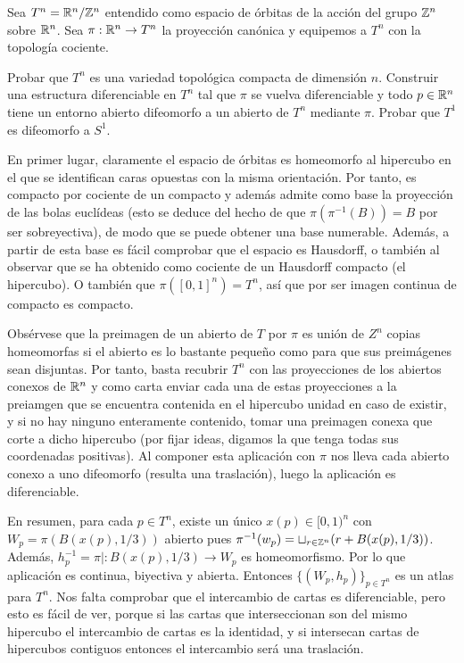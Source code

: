 \documentclass[twoside]{article}
\begin{document}
\begin{ejercicio}{8.4}
Sea $T^n=\mathbb{R}^n/\mathbb{Z}^n$ entendido como espacio de órbitas de la acción del grupo $\mathbb{Z}^n$ sobre $\mathbb{R}^n$. Sea $\pi:\mathbb{R}^n\to T^n$ la proyección canónica y equipemos a $T^n$ con la topología cociente.

Probar que $T^n$ es una variedad topológica compacta de dimensión $n$. Construir una estructura diferenciable en $T^n$ tal que $\pi$ se vuelva diferenciable y todo $p\in \mathbb{R}^n$ tiene un entorno abierto difeomorfo a un abierto de $T^n$ mediante $\pi$. Probar que $T^1$ es difeomorfo a $S^1$.  
\end{ejercicio}
\begin{solucion}
En primer lugar, claramente el espacio de órbitas es homeomorfo al hipercubo en el que se identifican caras opuestas con la misma orientación. Por tanto, es compacto por cociente de un compacto y además admite como base la proyección de las bolas euclídeas (esto se deduce del hecho de que $\pi(\pi^{-1}(B))=B$ por ser sobreyectiva), de modo que se puede obtener una base numerable. Además, a partir de esta base es fácil comprobar que el espacio es Hausdorff, o también al observar que se ha obtenido como cociente de un Hausdorff compacto (el hipercubo). O también que $\pi([0,1]^n)=T^n$, así que por ser imagen continua de compacto es compacto.

Obsérvese que la preimagen de un abierto de $T$ por $\pi$ es unión de $Z^n$ copias homeomorfas si el abierto es lo bastante pequeño como para que sus preimágenes sean disjuntas. Por tanto, basta recubrir $T^n$ con las proyecciones de los abiertos conexos de $\mathbb{R}^n$ y como carta enviar cada una de estas proyecciones a la preiamgen que se encuentra contenida en el hipercubo unidad en caso de existir, y si no hay ninguno enteramente contenido, tomar una preimagen conexa que corte a dicho hipercubo (por fijar ideas, digamos la que tenga todas sus coordenadas positivas). Al componer esta aplicación con $\pi$ nos lleva cada abierto conexo a uno difeomorfo (resulta una traslación), luego la aplicación es diferenciable. 

En resumen, para cada $p\in T^n$, existe un único $x(p)\in [0,1)^n$ con $W_p=\pi(B(x(p),1/3))$ abierto pues $\pi^{-1}(w_p)=\sqcup_{r\in\mathbb{Z}^n} (r+B(x(p),1/3))$. Además, $h_p^{-1}=\pi|:B(x(p),1/3)\to W_p$ es homeomorfismo. Por lo que aplicación es continua, biyectiva y abierta. Entonces $\{(W_p,h_p)\}_{p\in T^n}$ es un atlas para $T^n$. Nos falta comprobar que el intercambio de cartas es diferenciable, pero esto es fácil de ver, porque si las cartas que interseccionan son del mismo hipercubo el intercambio de cartas es la identidad, y si intersecan cartas de hipercubos contiguos entonces el intercambio será una traslación. 


\end{solucion}
\end{document}
